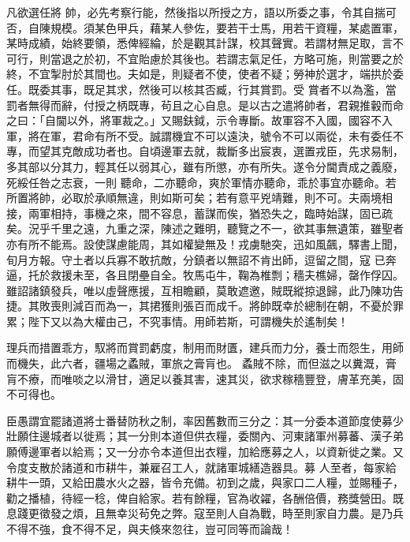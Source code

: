 \begin{pinyinscope}
 凡欲選任將
 帥，必先考察行能，然後指以所授之方，語以所委之事，令其自揣可否，自陳規模。須某色甲兵，藉某人參佐，要若干士馬，用若干資糧，某處置軍，某時成績，始終要領，悉俾經綸，於是觀其計謀，校其聲實。若謂材無足取，言不可行，則當退之於初，不宜貽慮於其後也。若謂志氣足任，方略可施，則當要之於終，不宜掣肘於其間也。夫如是，則疑者不使，使者不疑；勞神於選才，端拱於委任。既委其事，既足其求，然後可以核其否臧，行其賞罰。受
 賞者不以為濫，當罰者無得而辭，付授之柄既專，茍且之心自息。是以古之遣將帥者，君親推轂而命之曰：「自閫以外，將軍裁之。」又賜鈇鉞，示令專斷。故軍容不入國，國容不入軍，將在軍，君命有所不受。誠謂機宜不可以遠決，號令不可以兩從，未有委任不專，而望其克敵成功者也。自頃邊軍去就，裁斷多出宸衷，選置戎臣，先求易制，多其部以分其力，輕其任以弱其心，雖有所懲，亦有所失。遂令分閫責成之義廢，死綏任咎之志衰，一則
 聽命，二亦聽命，爽於軍情亦聽命，乖於事宜亦聽命。若所置將帥，必取於承順無違，則如斯可矣；若有意平兇靖難，則不可。夫兩境相接，兩軍相持，事機之來，間不容息，蓄謀而俟，猶恐失之，臨時始謀，固已疏矣。況乎千里之遠，九重之深，陳述之難明，聽覽之不一，欲其事無遺策，雖聖者亦有所不能焉。設使謀慮能周，其如權變無及！戎虜馳突，迅如風飆，驛書上聞，旬月方報。守土者以兵寡不敢抗敵，分鎮者以無詔不肯出師，逗留之間，寇
 已奔逼，托於救援未至，各且閉壘自全。牧馬屯牛，鞠為椎剽；穡夫樵婦，罄作俘囚。雖詔諸鎮發兵，唯以虛聲應援，互相瞻顧，莫敢遮邀，賊既縱掠退歸，此乃陳功告捷。其敗喪則減百而為一，其捃獲則張百而成千。將帥既幸於總制在朝，不憂於罪累；陛下又以為大權由己，不究事情。用師若斯，可謂機失於遙制矣！



 理兵而措置乖方，馭將而賞罰虧度，制用而財匱，建兵而力分，養士而怨生，用師而機失，此六者，疆場之蟊賊，軍旅之膏肓也。
 蟊賊不除，而但滋之以糞溉，膏肓不療，而唯啖之以滑甘，適足以養其害，速其災，欲求稼穡豐登，膚革充美，固不可得也。



 臣愚謂宜罷諸道將士番替防秋之制，率因舊數而三分之：其一分委本道節度使募少壯願住邊城者以徙焉；其一分則本道但供衣糧，委關內、河東諸軍州募蕃、漢子弟願傅邊軍者以給焉；又一分亦令本道但出衣糧，加給應募之人，以資新徙之業。又令度支散於諸道和市耕牛，兼雇召工人，就諸軍城繕造器具。募
 人至者，每家給耕牛一頭，又給田農水火之器，皆令充備。初到之歲，與家口二人糧，並賜種子，勸之播植，待經一稔，俾自給家。若有餘糧，官為收糴，各酬倍價，務獎營田。既息踐更徵發之煩，且無幸災茍免之弊。寇至則人自為戰，時至則家自力農。是乃兵不得不強，食不得不足，與夫倏來忽往，豈可同等而論哉！




\end{pinyinscope}
